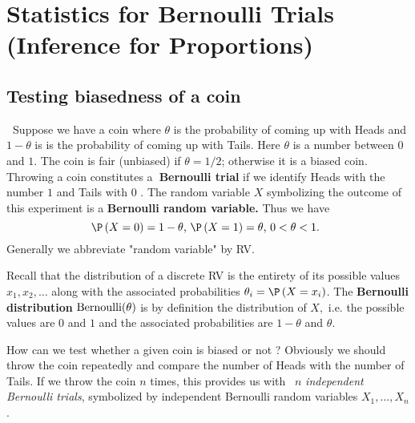 \section{Statistics for Bernoulli Trials (Inference for Proportions)}\label{S:InfForProps}

\subsection{ Testing biasedness of a coin}

\textbf{\ }Suppose we have a coin where $\theta$ is the probability of coming up
with Heads and $1-\theta$ is is the probability of coming up with Tails. Here $\theta$
is a number between $0$ and $1.$ The coin is fair (unbiased) if $\theta=1/2$;
otherwise it is a biased coin. Throwing a coin constitutes a\textbf{\
Bernoulli trial} if we identify Heads with the number $1$ and Tails with $0$%
. The random variable $X$ symbolizing the outcome of this experiment is a 
\textbf{Bernoulli random variable.} Thus we have 
\begin{equation*}
\P \left( X=0\right) =1-\theta\text{, }\P \left( X=1\right) =\theta\text{, }0<\theta<1%
\text{. }
\end{equation*}%
Generally we abbreviate "random variable" by RV.

Recall that the distribution of a discrete RV is the entirety of its
possible values $x_{1},x_{2},\ldots $ along with the associated
probabilities $\theta_{i}=\P \left( X=x_{i}\right) $. The \textbf{Bernoulli
distribution} $\mbox{{\rm Bernoulli}}(\theta)$ is by definition the distribution of $X,$
i.e. the possible values are $0$ and $1$ and the associated probabilities
are $1-\theta$ and $\theta$.

How can we test whether a given coin is biased or not ? Obviously we should
throw the coin repeatedly and compare the number of Heads with the number of
Tails. If we throw the coin $n$ times, this provides us with \ $n$ \textit{%
independent Bernoulli trials}, symbolized by independent Bernoulli random
variables $X_{1},\ldots ,X_{n}$. \bigskip \bigskip

